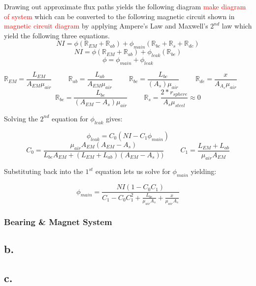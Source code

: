 \documentclass{article}
\newcommand{\xxx}[1]{\textcolor{red}{#1}}
\theoremstyle{plain}
\theoremstyle{definition}
\theoremstyle{remark}
\begin{document}
Drawing out approximate flux paths yields the following diagram \xxx{make diagram of system} which can be converted to the following magnetic circuit shown in \xxx{magnetic circuit diagram} by applying Ampere's Law and Maxwell's $2^{nd}$ law which yield the following three equations.  \\

$$ NI = \phi \left (\mathbb{R}_{EM} + \mathbb{R}_{ab}\right) + \phi_{main} \left( \mathbb{R}_{bc}+\mathbb{R}_{s}+\mathbb{R}_{dc} \right) $$
$$ NI = \phi \left( \mathbb{R}_{EM} + \mathbb{R}_{ab} \right) + \phi_{leak} \left( \mathbb{R}_{be} \right) $$
$$ \phi = \phi_{main} + \phi_{leak} $$


$$ \mathbb{R}_{EM} = \frac{L_{EM}}{A_{EM}\mu_{air}}  \hspace{1cm} \mathbb{R}_{ab} = \frac{L_{ab}}{A_{EM}\mu_{air}} \hspace{1cm} \mathbb{R}_{bc} = \frac{L_{bc}}{(A_{s})\mu_{air}} \hspace{1cm} \mathbb{R}_{de} = \frac{x}{A_{A_{s}}\mu_{air}} \hspace{1cm} $$ $$ \mathbb{R}_{be} = \frac{L_{be}}{(A_{EM} - A_{s})\mu_{air}}  \hspace{1cm}  \mathbb{R}_{s} = \frac{2*r_{sphere}}{A_{s}\mu_{steel}} \approx 0$$

Solving the $2^{nd}$ equation for $\phi_{leak}$ gives:

$$\phi_{leak} = C_{0}\left( NI-C_{1}\phi_{main} \right)$$ 
$$C_{0} = \frac{\mu_{air} A_{EM} (A_{EM} - A_{s})}{L_{be} A_{EM} + (L_{EM} + L_{ab})(A_{EM} - A_{s}))} \hspace{1cm} 
C_{1} = \frac{L_{EM} + L_{ab}}{\mu_{air} A_{EM}} $$

Substituting back into the $1^{st}$ equation lets us solve for $\phi_{main}$ yielding: 

$$ \phi_{main} = \frac{NI(1-C_{0}C_{1})}{C_{1} - C_{0} C_{1}^2 + \frac{L_{bc}}{\mu_{air} A_{s}} + \frac{x}{\mu_{air} A_{s}}} $$
\subsubsection{Bearing \& Magnet System}

\subsection*{b.}

\subsection*{c.}
\end{document}
